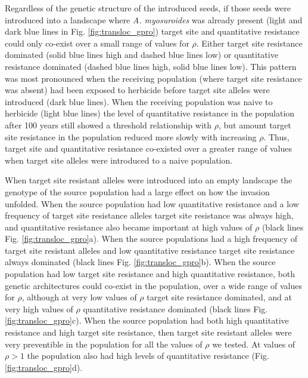 \documentclass[10pt,letterpaper]{article}
\begin{document}
Regardless of the genetic structure of the introduced seeds, if those seeds were introduced into a landscape where \textit{A. myosuroides} was already present (light and dark blue lines in Fig. \ref{fig:transloc_gpro}) target site and quantitative resistance could only co-exist over a small range of values for $\rho$. Either target site resistance dominated (solid blue lines high and dashed blue lines low) or quantitative resistance dominated (dashed blue lines high, solid blue lines low). This pattern was most pronounced when the receiving population (where target site resistance was absent) had been exposed to herbicide before target site alleles were introduced (dark blue lines). When the receiving population was naive to herbicide (light blue lines) the level of quantitative resistance in the population after 100 years still showed a threshold relationship with $\rho$, but amount target site resistance in the population reduced more slowly with increasing $\rho$. Thus, target site and quantitative resistance co-existed over a greater range of values when target site alleles were introduced to a naive population.

When target site resistant alleles were introduced into an empty landscape the genotype of the source population had a large effect on how the invasion unfolded. When the source population had low quantitative resistance and a low frequency of target site resistance alleles target site resistance was always high, and quantitative resistance also became important at high values of $\rho$ (black lines Fig. \ref{fig:transloc_gpro}a). When the source populations had a high frequency of target site resistant alleles and low quantitative resistance target site resistance always dominated (black lines Fig. \ref{fig:transloc_gpro}b). When the source population had low target site resistance and high quantitative resistance, both genetic architectures could co-exist in the population, over a wide range of values for $\rho$, although at very low values of $\rho$ target site resistance dominated, and at very high values of $\rho$ quantitative resistance dominated (black lines Fig. \ref{fig:transloc_gpro}c). When the source population had both high quantitative resistance and high target site resistance, then target site resistant alleles were very preventible in the population for all the values of $\rho$ we tested. At values of $\rho > 1$ the population also had high levels of quantitative resistance (Fig. \ref{fig:transloc_gpro}d).                      
\end{document}
